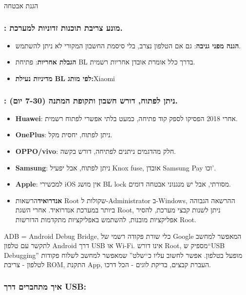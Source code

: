 
הגנת אבטחה

\subsubsection*{: מונע צריבת תוכנות זדוניות למערכת.}

\begin{itemize}
  \item \textbf{הגנה מפני גניבה}: גם אם הטלפון נצרב, בלי סיסמת החשבון המקורי לא ניתן להשתמש.
  \item \textbf{הגבלת אחריות}: פתיחת BL בדרך כלל אומרת אובדן אחריות רשמית.
  \item \textbf{מדיניות נעילת BL לפי מותג:}Xiaomi
\end{itemize}

\subsubsection*{: ניתן לפתוח, דורש חשבון ותקופת המתנה (7-30 יום).}

\begin{itemize}
  \item \textbf{Huawei}: אחרי 2018 הפסיקו לספק קוד פתיחה, כמעט בלתי אפשרי לפתוח רשמית.
  \item \textbf{OnePlus}: ניתן לפתוח, יחסית מקל.
  \item \textbf{OPPO/vivo}: חלק מהדגמים ניתנים לפתיחה, דורש בקשה.
  \item \textbf{Samsung}: ניתן לפתוח, אבל יפעיל Knox fuse, אובדן Samsung Pay וכו'.
  \item \textbf{Apple}: למכשירי iOS אין מושג BL lock מסורתי, אבל יש מנגנוני אבטחה דומים.
  \item \textbf{אנדרואיד}הרשאות Root שקולות ל-Administrator ב-Windows, ההרשאה הגבוהה ביותר במערכת אנדרואיד. אחרי השגת Root, ניתן לשנות קבצי מערכת, להסיר אפליקציות מובנות, להשתמש באפליקציות מתקדמות הדורשות Root.
\end{itemize}


ADB = Android Debug Bridge, כלי שורת פקודה רשמי של Google המאפשר למחשב לתקשר עם טלפון Android דרך USB או Wi-Fi. אינו דורש Root, מספיק ש“USB Debugging” מופעל בטלפון. אפשר לחשוב עליו כ“שלט” שמאפשר למחשב לשלוח פקודות לטלפון - צריבת ROM, התקנת App, העברת קבצים, בדיקת לוגים - הכל דרכו.

\subsubsection*{איך מתחברים דרך USB:}

